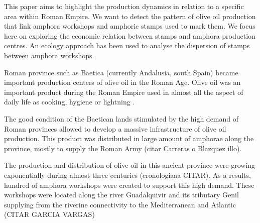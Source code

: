 \documentclass[review]{elsarticle}
\begin{document}
This paper aims to highlight the production dynamics in relation to a specific area within Roman Empire. We want to detect the pattern of olive oil production that link amphora workshops and amphoric stamps used to mark them. We focus here on exploring the economic relation between stamps and amphora production centres. An ecology approach has been used to analyse the dispersion of stamps between amphora workshops. 




Roman province such as Baetica (currently Andalusia, south Spain) became important production centers of olive oil in the Roman Age. Olive oil was an important product during the Roman Empire used in almost all the aspect of daily life as cooking, hygiene or lightning \citep{mattingly_d.j._oil_1988}. 

The good condition of the Baetican lands stimulated by the high demand of Roman provinces allowed to develop a massive infrastructure of olive oil production. This product was distributed in large amount of amphorae along the province, mostly to supply the Roman Army (citar Carreras o Blazquez illo). 

The production and distribution of olive oil in this ancient province were growing exponentially during almost three centuries (cronologiaaa CITAR). As a results, hundred of amphora workshops were created to support this high demand. These workshops were located along the river Guadalquivir and its tributary Genil supplying from the riverine connectivity to the Mediterranean and Atlantic (CITAR GARCIA VARGAS)
\end{document}

